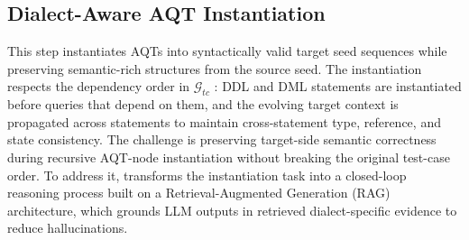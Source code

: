 \documentclass[conference]{IEEEtran}
\begin{document}
\subsection{Dialect-Aware AQT Instantiation}
\label{sec:translation}
This step instantiates AQTs into syntactically valid target seed sequences while preserving semantic-rich structures from the source seed.
The instantiation respects the dependency order in $\mathcal{G}_{tc}$%
: DDL and DML statements are instantiated before queries that depend on them, and the evolving target context is propagated across statements to maintain cross-statement type, reference, and state consistency.
The challenge is preserving target-side semantic correctness during recursive AQT-node instantiation without breaking the original test-case order.
To address it, \tool{} transforms the instantiation task into a closed-loop reasoning process built on a Retrieval-Augmented Generation (RAG) architecture, which grounds LLM outputs in retrieved dialect-specific evidence to reduce hallucinations.
\end{document}
